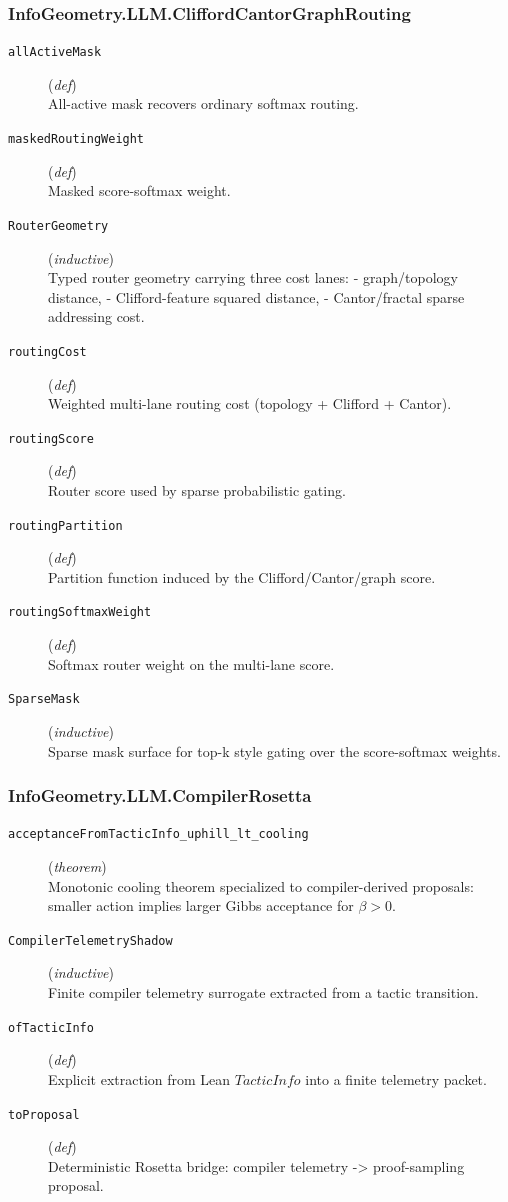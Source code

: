 \documentclass[11pt,a4paper]{article}
\begin{document}
\subsubsection*{InfoGeometry.LLM.CliffordCantorGraphRouting}
\begin{description}
  \item[\texttt{allActiveMask}] (\textit{def}) \\ All-active mask recovers ordinary softmax routing.
  \item[\texttt{maskedRoutingWeight}] (\textit{def}) \\ Masked score-softmax weight.
  \item[\texttt{RouterGeometry}] (\textit{inductive}) \\ Typed router geometry carrying three cost lanes: 
- graph/topology distance, 
- Clifford-feature squared distance, 
- Cantor/fractal sparse addressing cost.
  \item[\texttt{routingCost}] (\textit{def}) \\ Weighted multi-lane routing cost (topology + Clifford + Cantor).
  \item[\texttt{routingScore}] (\textit{def}) \\ Router score used by sparse probabilistic gating.
  \item[\texttt{routingPartition}] (\textit{def}) \\ Partition function induced by the Clifford/Cantor/graph score.
  \item[\texttt{routingSoftmaxWeight}] (\textit{def}) \\ Softmax router weight on the multi-lane score.
  \item[\texttt{SparseMask}] (\textit{inductive}) \\ Sparse mask surface for top-k style gating over the score-softmax weights.
\end{description}
\subsubsection*{InfoGeometry.LLM.CompilerRosetta}
\begin{description}
  \item[\texttt{acceptanceFromTacticInfo\_uphill\_lt\_cooling}] (\textit{theorem}) \\ Monotonic cooling theorem specialized to compiler-derived proposals: 
smaller action implies larger Gibbs acceptance for $\beta  > 0$.
  \item[\texttt{CompilerTelemetryShadow}] (\textit{inductive}) \\ Finite compiler telemetry surrogate extracted from a tactic transition.
  \item[\texttt{ofTacticInfo}] (\textit{def}) \\ Explicit extraction from Lean $TacticInfo$ into a finite telemetry packet.
  \item[\texttt{toProposal}] (\textit{def}) \\ Deterministic Rosetta bridge: 
compiler telemetry -> proof-sampling proposal.
\end{description}
\end{document}
